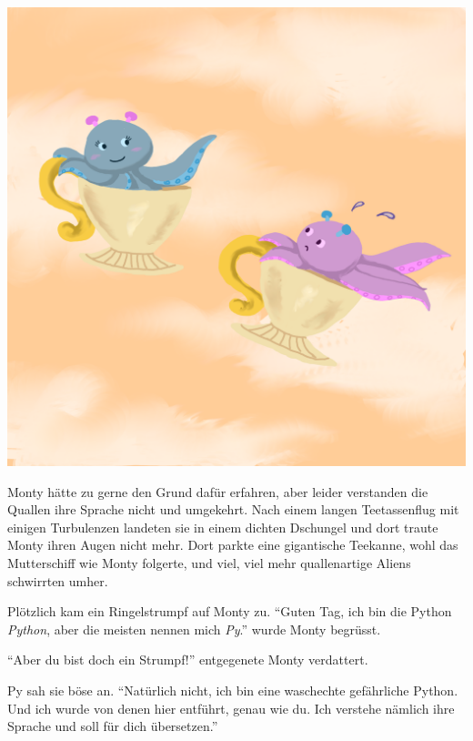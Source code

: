 \documentclass[a5paper,12pt,twoside,openright]{scrbook}
\begin{document}
\begin{center}
 \includegraphics[scale = 0.1]{aliens.png}
\end{center}
Monty hätte zu gerne den Grund dafür erfahren, aber leider verstanden die Quallen ihre Sprache nicht und umgekehrt.
Nach einem langen Teetassenflug mit einigen Turbulenzen landeten sie in einem dichten Dschungel und dort traute Monty ihren Augen nicht mehr.
Dort parkte eine gigantische Teekanne, wohl das Mutterschiff wie Monty folgerte, und viel, viel mehr quallenartige Aliens schwirrten umher.

Plötzlich kam ein Ringelstrumpf auf Monty zu.
"`Guten Tag, ich bin die Python \emph{Python}, aber die meisten nennen mich \emph{Py}."' wurde Monty begrüsst.

"`Aber du bist doch ein Strumpf!"' entgegenete Monty verdattert.

Py sah sie böse an. 
"`Natürlich nicht, ich bin eine waschechte gefährliche Python. Und ich wurde von denen hier entführt, genau wie du.
Ich verstehe nämlich ihre Sprache und soll für dich übersetzen."'
\end{document}
